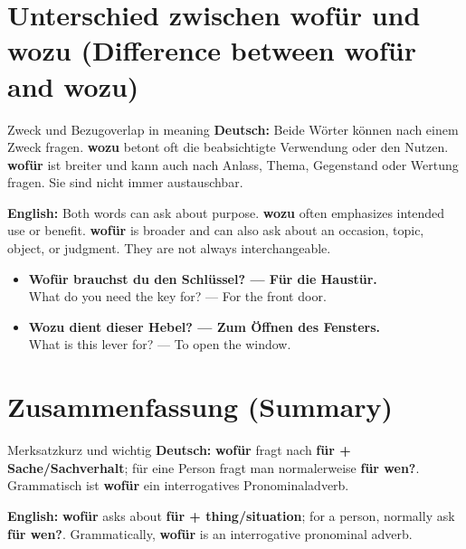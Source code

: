 \documentclass[a4paper,11pt]{article}
\newcommand{\GermanText}[1]{\textbf{Deutsch: }#1\par}
\newcommand{\EnglishText}[1]{{\small\color{SoftGray}\textbf{English: }#1\par}}
\newcommand{\ExampleItem}[2]{\item \textbf{#1}\\{\small\color{SoftGray}#2}}
\begin{document}
\section{Unterschied zwischen wofür und wozu (Difference between wofür and wozu)}
\begin{grammarentry}{Zweck und Bezug}{overlap in meaning}
\GermanText{Beide Wörter können nach einem Zweck fragen. \textbf{wozu} betont oft die beabsichtigte Verwendung oder den Nutzen. \textbf{wofür} ist breiter und kann auch nach Anlass, Thema, Gegenstand oder Wertung fragen. Sie sind nicht immer austauschbar.}
\EnglishText{Both words can ask about purpose. \textbf{wozu} often emphasizes intended use or benefit. \textbf{wofür} is broader and can also ask about an occasion, topic, object, or judgment. They are not always interchangeable.}
\end{grammarentry}
\begin{exbox}\begin{itemize}
\ExampleItem{Wofür brauchst du den Schlüssel? — Für die Haustür.}{What do you need the key for? — For the front door.}
\ExampleItem{Wozu dient dieser Hebel? — Zum Öffnen des Fensters.}{What is this lever for? — To open the window.}
\end{itemize}\end{exbox}

\section{Zusammenfassung (Summary)}
\begin{grammarentry}{Merksatz}{kurz und wichtig}
\GermanText{\textbf{wofür} fragt nach \textbf{für + Sache/Sachverhalt}; für eine Person fragt man normalerweise \textbf{für wen?}. Grammatisch ist \textbf{wofür} ein interrogatives Pronominaladverb.}
\EnglishText{\textbf{wofür} asks about \textbf{für + thing/situation}; for a person, normally ask \textbf{für wen?}. Grammatically, \textbf{wofür} is an interrogative pronominal adverb.}
\end{grammarentry}
\end{document}
